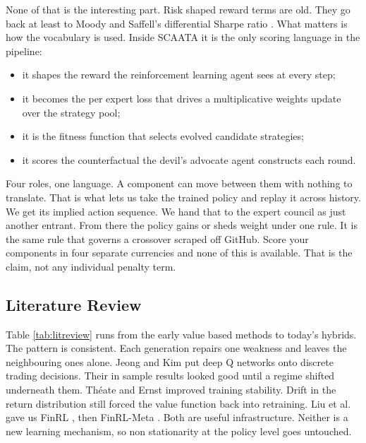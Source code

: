 \documentclass[conference]{IEEEtran}
\begin{document}
None of that is the interesting part. Risk shaped reward terms are old. They go back at least to Moody and Saffell's differential Sharpe ratio \cite{moody2001learning}. What matters is how the vocabulary is used. Inside SCAATA it is the only scoring language in the pipeline:

\begin{itemize}
\item it shapes the reward the reinforcement learning agent sees at every step;
\item it becomes the per expert loss that drives a multiplicative weights update over the strategy pool;
\item it is the fitness function that selects evolved candidate strategies;
\item it scores the counterfactual the devil's advocate agent constructs each round.
\end{itemize}

Four roles, one language. A component can move between them with nothing to translate. That is what lets us take the trained policy and replay it across history. We get its implied action sequence. We hand that to the expert council as just another entrant. From there the policy gains or sheds weight under one rule. It is the same rule that governs a crossover scraped off GitHub. Score your components in four separate currencies and none of this is available. That is the claim, not any individual penalty term.

\subsection{Literature Review}

Table \ref{tab:litreview} runs from the early value based methods to today's hybrids. The pattern is consistent. Each generation repairs one weakness and leaves the neighbouring ones alone. Jeong and Kim \cite{jeong2019dqn} put deep Q networks onto discrete trading decisions. Their in sample results looked good until a regime shifted underneath them. Th\'eate and Ernst \cite{theate2021drl} improved training stability. Drift in the return distribution still forced the value function back into retraining. Liu et al. gave us FinRL \cite{liu2020finrl}, then FinRL-Meta \cite{liu2022finrlmeta}. Both are useful infrastructure. Neither is a new learning mechanism, so non stationarity at the policy level goes untouched.
\end{document}
